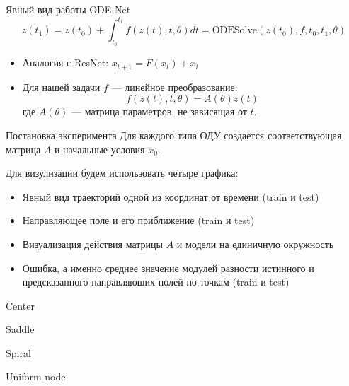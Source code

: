 \documentclass{beamer}
\begin{document}
\begin{frame}{Явный вид работы ODE-Net}
    \[
        z(t_1) = z(t_0) + \int_{t_0}^{t_1} f(z(t), t, \theta) dt = \text{ODESolve}(z(t_0), f, t_0, t_1, \theta)
    \]
    \begin{itemize}
        \item Аналогия с ResNet: \( x_{t+1} = F(x_t) + x_t \)
        \item Для нашей задачи \(f\) — линейное преобразование:
        \[
        f(z(t), t, \theta) = A(\theta) z(t)
        \]
        где \(A(\theta)\) — матрица параметров, не зависящая от \(t\).
    \end{itemize}
\end{frame}


\begin{frame}{Постановка эксперимента}
    Для каждого типа ОДУ создается соответствующая матрица \(A\) и начальные условия \(x_0\).

    Для визулизации будем использовать четыре графика:
    \begin{itemize}
        \item Явный вид траекторий одной из координат от времени (train и test)
        \item Направляющее поле и его приближение (train и test)
        \item Визуализация действия матрицы \(A\) и модели на единичную окружность
        \item Ошибка, а именно среднее значение модулей разности истинного и предсказанного направляющих полей по  точкам (train и test)
    \end{itemize}
\end{frame}

\begin{frame}{Center}
    \centering
\end{frame}

\begin{frame}{Saddle}
    \centering
\end{frame}

\begin{frame}{Spiral}
    \centering
\end{frame}

\begin{frame}{Uniform node}
    \centering
\end{frame}
\end{document}
